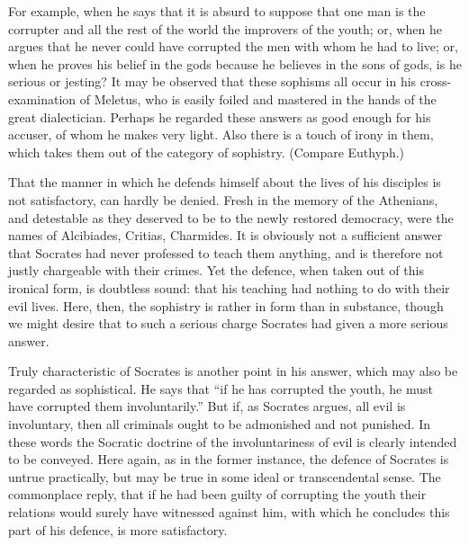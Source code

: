\documentclass[11pt,letter]{article}
\begin{document}
\par  For example, when he says that it is absurd to suppose that one man is the corrupter and all the rest of the world the improvers of the youth; or, when he argues that he never could have corrupted the men with whom he had to live; or, when he proves his belief in the gods because he believes in the sons of gods, is he serious or jesting? It may be observed that these sophisms all occur in his cross-examination of Meletus, who is easily foiled and mastered in the hands of the great dialectician. Perhaps he regarded these answers as good enough for his accuser, of whom he makes very light. Also there is a touch of irony in them, which takes them out of the category of sophistry. (Compare Euthyph.)

\par  That the manner in which he defends himself about the lives of his disciples is not satisfactory, can hardly be denied. Fresh in the memory of the Athenians, and detestable as they deserved to be to the newly restored democracy, were the names of Alcibiades, Critias, Charmides. It is obviously not a sufficient answer that Socrates had never professed to teach them anything, and is therefore not justly chargeable with their crimes. Yet the defence, when taken out of this ironical form, is doubtless sound: that his teaching had nothing to do with their evil lives. Here, then, the sophistry is rather in form than in substance, though we might desire that to such a serious charge Socrates had given a more serious answer.

\par  Truly characteristic of Socrates is another point in his answer, which may also be regarded as sophistical. He says that “if he has corrupted the youth, he must have corrupted them involuntarily.” But if, as Socrates argues, all evil is involuntary, then all criminals ought to be admonished and not punished. In these words the Socratic doctrine of the involuntariness of evil is clearly intended to be conveyed. Here again, as in the former instance, the defence of Socrates is untrue practically, but may be true in some ideal or transcendental sense. The commonplace reply, that if he had been guilty of corrupting the youth their relations would surely have witnessed against him, with which he concludes this part of his defence, is more satisfactory.
\end{document}
